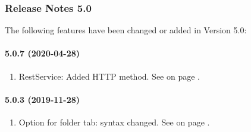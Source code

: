 \subsubsection{Release Notes 5.0}
\label{sec:releasenotes-5-0}
The following features have been changed or added in Version 5.0:\\

\paragraph{5.0.7 (2020-04-28)}
\begin{enumerate}
\item RestService: Added HTTP \POST{} method.
      See  on page \pageref{dia:restServiceaction}.
\end{enumerate}
\paragraph{5.0.3 (2019-11-28)}
\begin{enumerate}
\item Option \OMITTTRAIL{} for \MAP{} folder tab: syntax changed.
      See  on page \pageref{dia:jobmapelement}.
\end{enumerate}
